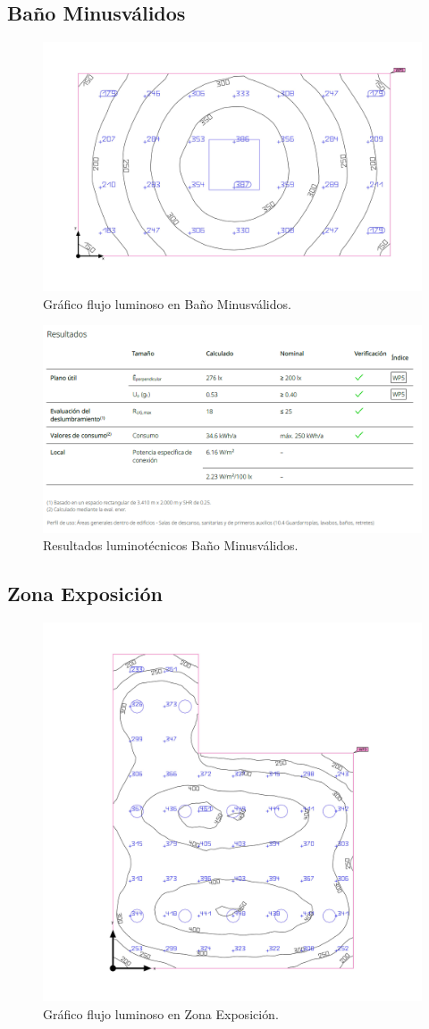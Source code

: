 \documentclass[../main.tex]{subfiles}
\begin{document}
\subsection{Baño Minusválidos}
\begin{figure}[H]
    \centering
    \includegraphics[width=0.5\linewidth]{Imagenes/Iluminacion Bano Minusvalidos.png}
    \caption{Gráfico flujo luminoso en Baño Minusválidos.}
\end{figure}

\begin{figure}[H]
    \centering
    \includegraphics[width=0.75\linewidth]{Imagenes/Resultados Iluminacion Bano Minusvalidos.png}
    \caption{Resultados luminotécnicos Baño Minusválidos.}
\end{figure}

\subsection{Zona Exposición}
\begin{figure}[H]
    \centering
    \includegraphics[width=0.5\linewidth]{Imagenes/Iluminacion Zona Exposicion.png}
    \caption{Gráfico flujo luminoso en Zona Exposición.}
\end{figure}
\end{document}
